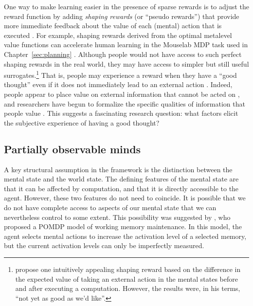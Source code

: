 One way to make learning easier in the presence of sparse rewards is to adjust the reward function by adding \emph{shaping rewards} (or ``pseudo rewards'') that provide more immediate feedback about the value of each (mental) action that is executed \citep{ng1999policy}. For example, shaping rewards derived from the optimal metalevel value functions can accelerate human learning in the Mouselab MDP task used in Chapter~\ref{sec:planning} \citep{callaway2022leveraging}. Although people would not have access to such perfect shaping rewards in the real world, they may have access to simpler but still useful surrogates.\footnote{%
  \citet{hay2016principles} propose one intuitively appealing shaping reward based on the difference in the expected value of taking an external action in the mental states before and after executing a computation. However, the results were, in his terms, ``not yet as good as we’d like''.
} That is, people may experience a reward when they have a ``good thought'' even if it does not immediately lead to an external action \citep{gopnik1998explanation}. Indeed, people appear to place value on external information that cannot be acted on \citep{eliaz2007experimental,gottlieb2018neuroscience}, and researchers have begun to formalize the specific qualities of information that people value \citep{markant2014preference,markant2016selfdirected}. This suggests a fascinating research question: what factors elicit the subjective experience of having a good thought?


\subsection{Partially observable minds}\label{sec:partially-observable}


A key structural assumption in the framework is the distinction between the mental state and the world state. The defining features of the mental state are that it can be affected by computation, and that it is directly accessible to the agent. However, these two features do not need to coincide. It is possible that we do not have complete access to aspects of our mental state that we can nevertheless control to some extent. This possibility was suggested by \citet{suchow2016deciding}, who proposed a POMDP model of working memory maintenance. In this model, the agent selects mental actions to increase the activation level of a selected memory, but the current activation levels can only be imperfectly measured.


